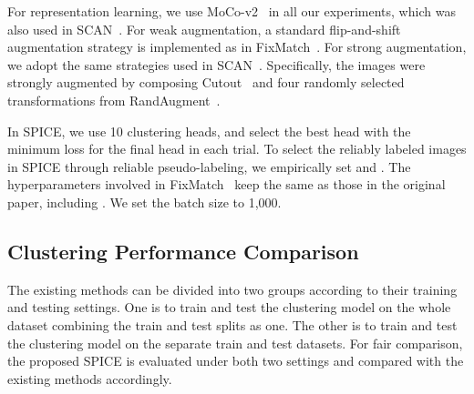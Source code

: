 \documentclass[journal]{IEEEtran}
\begin{document}
For representation learning, we use MoCo-v2~\cite{He_2020_CVPR} in all our experiments, which was also used in SCAN~\cite{scan}.
For weak augmentation, a standard flip-and-shift augmentation strategy is implemented as in FixMatch~\cite{fixmatch}.
For strong augmentation, we adopt the same strategies used in SCAN~\cite{scan}. Specifically, the images were strongly augmented by composing Cutout~\cite{cutout} and four randomly selected transformations from RandAugment~\cite{randaugent}.

In SPICE, we use 10 clustering heads, and select the best head with the minimum loss for the final head in each trial.
To select the reliably labeled images in SPICE through reliable pseudo-labeling, we empirically set  and .
The hyperparameters involved in FixMatch~\cite{fixmatch} keep the same as those in the original paper, including .
We set the batch size  to 1,000.




\subsection{Clustering Performance Comparison}
\label{sec_resutls_clustering}
The existing methods can be divided into two groups according to their training and testing settings.
One is to train and test the clustering model on the whole dataset combining the train and test splits as one.
The other is to train and test the clustering model on the separate train and test datasets.
For fair comparison, the proposed SPICE is evaluated under both two settings and compared with the existing methods accordingly.
\end{document}
